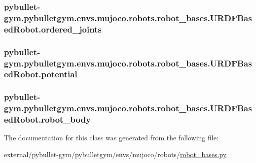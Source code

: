 \subsubsection[{\texorpdfstring{ordered\+\_\+joints}{ordered_joints}}]{\setlength{\rightskip}{0pt plus 5cm}pybullet-\/gym.\+pybulletgym.\+envs.\+mujoco.\+robots.\+robot\+\_\+bases.\+U\+R\+D\+F\+Based\+Robot.\+ordered\+\_\+joints}\hypertarget{classpybullet-gym_1_1pybulletgym_1_1envs_1_1mujoco_1_1robots_1_1robot__bases_1_1_u_r_d_f_based_robot_a2f795c71604f8bfbb682e72433db6a5b}{}\label{classpybullet-gym_1_1pybulletgym_1_1envs_1_1mujoco_1_1robots_1_1robot__bases_1_1_u_r_d_f_based_robot_a2f795c71604f8bfbb682e72433db6a5b}
\subsubsection[{\texorpdfstring{potential}{potential}}]{\setlength{\rightskip}{0pt plus 5cm}pybullet-\/gym.\+pybulletgym.\+envs.\+mujoco.\+robots.\+robot\+\_\+bases.\+U\+R\+D\+F\+Based\+Robot.\+potential}\hypertarget{classpybullet-gym_1_1pybulletgym_1_1envs_1_1mujoco_1_1robots_1_1robot__bases_1_1_u_r_d_f_based_robot_a185704858da885fab64145b72510b205}{}\label{classpybullet-gym_1_1pybulletgym_1_1envs_1_1mujoco_1_1robots_1_1robot__bases_1_1_u_r_d_f_based_robot_a185704858da885fab64145b72510b205}
\subsubsection[{\texorpdfstring{robot\+\_\+body}{robot_body}}]{\setlength{\rightskip}{0pt plus 5cm}pybullet-\/gym.\+pybulletgym.\+envs.\+mujoco.\+robots.\+robot\+\_\+bases.\+U\+R\+D\+F\+Based\+Robot.\+robot\+\_\+body}\hypertarget{classpybullet-gym_1_1pybulletgym_1_1envs_1_1mujoco_1_1robots_1_1robot__bases_1_1_u_r_d_f_based_robot_a089de661bf8e75dd14bac8960280f547}{}\label{classpybullet-gym_1_1pybulletgym_1_1envs_1_1mujoco_1_1robots_1_1robot__bases_1_1_u_r_d_f_based_robot_a089de661bf8e75dd14bac8960280f547}


The documentation for this class was generated from the following file\+:\begin{DoxyCompactItemize}
\item 
external/pybullet-\/gym/pybulletgym/envs/mujoco/robots/\hyperlink{mujoco_2robots_2robot__bases_8py}{robot\+\_\+bases.\+py}\end{DoxyCompactItemize}
